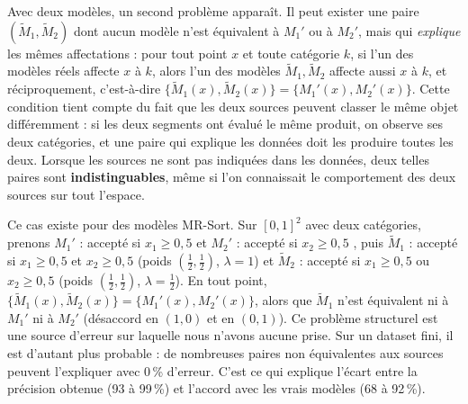 \documentclass[11pt,a4paper]{article}
\begin{document}
Avec deux modèles, un second problème apparaît. Il peut exister une paire $(\tilde{M}_1, \tilde{M}_2)$ dont
aucun modèle n'est équivalent à $M_1'$ ou à $M_2'$, mais qui \emph{explique} les mêmes affectations : pour tout
point $x$ et toute catégorie $k$, si l'un des modèles réels affecte $x$ à $k$, alors l'un des modèles
$\tilde{M}_1, \tilde{M}_2$ affecte aussi $x$ à $k$, et réciproquement, c'est-à-dire
$\{\tilde{M}_1(x), \tilde{M}_2(x)\} = \{M_1'(x), M_2'(x)\}$. Cette condition tient compte du fait que les deux
sources peuvent classer le même objet différemment : si les deux segments ont évalué le même produit, on
observe ses deux catégories, et une paire qui explique les données doit les produire toutes les deux. Lorsque
les sources ne sont pas indiquées dans les données, deux telles paires sont \textbf{indistinguables}, même si
l'on connaissait le comportement des deux sources sur tout l'espace.

Ce cas existe pour des modèles MR-Sort. Sur $[0,1]^2$ avec deux catégories, prenons $M_1'$ : \og accepté si
$x_1 \ge 0{,}5$ \fg{} et $M_2'$ : \og accepté si $x_2 \ge 0{,}5$ \fg{}, puis $\tilde{M}_1$ : \og accepté si
$x_1 \ge 0{,}5$ et $x_2 \ge 0{,}5$ \fg{} (poids $(\frac12,\frac12)$, $\lambda=1$) et $\tilde{M}_2$ : \og accepté
si $x_1 \ge 0{,}5$ ou $x_2 \ge 0{,}5$ \fg{} (poids $(\frac12,\frac12)$, $\lambda=\frac12$). En tout point,
$\{\tilde{M}_1(x), \tilde{M}_2(x)\} = \{M_1'(x), M_2'(x)\}$, alors que $\tilde{M}_1$ n'est équivalent ni à $M_1'$
ni à $M_2'$ (désaccord en $(1,0)$ et en $(0,1)$). Ce problème structurel est une source d'erreur sur laquelle nous
n'avons aucune prise. Sur un dataset fini, il est d'autant plus probable : de nombreuses paires non équivalentes
aux sources peuvent l'expliquer avec 0\,\% d'erreur. C'est ce qui explique l'écart entre la précision obtenue
(93 à 99\,\%) et l'accord avec les vrais modèles (68 à 92\,\%).
\end{document}
